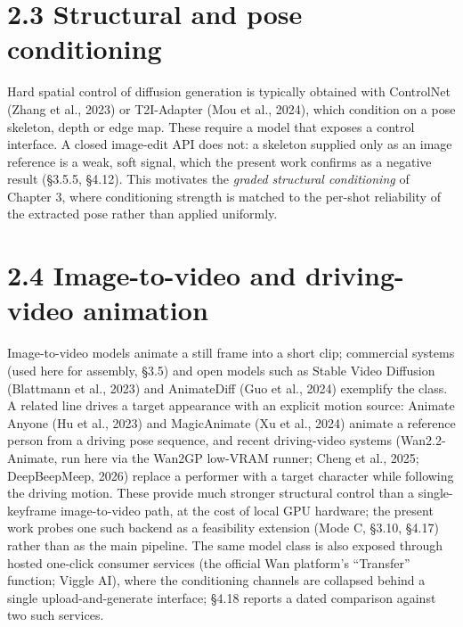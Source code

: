 \documentclass[10pt,twocolumn,letterpaper]{article}
\begin{document}

\section*{2.3 Structural and pose conditioning}

Hard spatial control of diffusion generation is typically obtained with ControlNet (Zhang et al., 2023) or T2I-Adapter (Mou et al., 2024), which condition on a pose skeleton, depth or edge map. These require a model that exposes a control interface. A closed image-edit API does not: a skeleton supplied only as an image reference is a weak, soft signal, which the present work confirms as a negative result (\S{}3.5.5, \S{}4.12). This motivates the \emph{graded structural conditioning} of Chapter 3, where conditioning strength is matched to the per-shot reliability of the extracted pose rather than applied uniformly.


\section*{2.4 Image-to-video and driving-video animation}

Image-to-video models animate a still frame into a short clip; commercial systems (used here for assembly, \S{}3.5) and open models such as Stable Video Diffusion (Blattmann et al., 2023) and AnimateDiff (Guo et al., 2024) exemplify the class. A related line drives a target appearance with an explicit motion source: Animate Anyone (Hu et al., 2023) and MagicAnimate (Xu et al., 2024) animate a reference person from a driving pose sequence, and recent driving-video systems (Wan2.2-Animate, run here via the Wan2GP low-VRAM runner; Cheng et al., 2025; DeepBeepMeep, 2026) replace a performer with a target character while following the driving motion. These provide much stronger structural control than a single-keyframe image-to-video path, at the cost of local GPU hardware; the present work probes one such backend as a feasibility extension (Mode C, \S{}3.10, \S{}4.17) rather than as the main pipeline. The same model class is also exposed through hosted one-click consumer services (the official Wan platform's ``Transfer'' function; Viggle AI), where the conditioning channels are collapsed behind a single upload-and-generate interface; \S{}4.18 reports a dated comparison against two such services.
\end{document}
